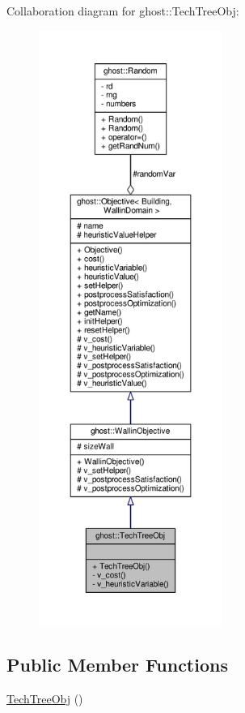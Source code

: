 Collaboration diagram for ghost\-:\-:Tech\-Tree\-Obj\-:
\nopagebreak
\begin{figure}[H]
\begin{center}
\leavevmode
\includegraphics[height=550pt]{classghost_1_1TechTreeObj__coll__graph}
\end{center}
\end{figure}
\subsection*{Public Member Functions}
\begin{DoxyCompactItemize}
\item 
\hyperlink{classghost_1_1TechTreeObj_a94ae9f4d4aa715977fab009f54a0dbd5}{Tech\-Tree\-Obj} ()
\end{DoxyCompactItemize}
